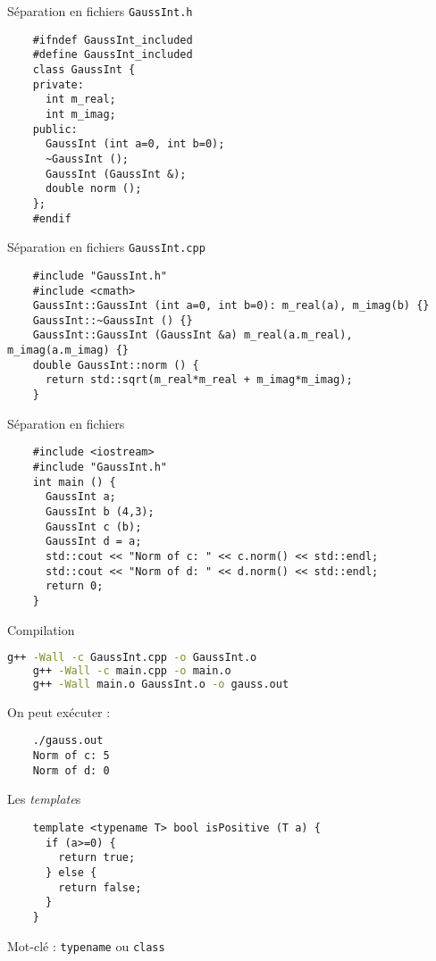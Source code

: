 \begin{frame}[fragile]{Séparation en fichiers}
  \texttt{GaussInt.h}
  \begin{lstlisting}
    #ifndef GaussInt_included
    #define GaussInt_included
    class GaussInt {
    private:
      int m_real;
      int m_imag;
    public:
      GaussInt (int a=0, int b=0);
      ~GaussInt ();
      GaussInt (GaussInt &);
      double norm ();
    };
    #endif
  \end{lstlisting}
\end{frame}

\begin{frame}[fragile]{Séparation en fichiers}
  \texttt{GaussInt.cpp}
  \begin{lstlisting}
    #include "GaussInt.h"
    #include <cmath>
    GaussInt::GaussInt (int a=0, int b=0): m_real(a), m_imag(b) {}
    GaussInt::~GaussInt () {}
    GaussInt::GaussInt (GaussInt &a) m_real(a.m_real), m_imag(a.m_imag) {}
    double GaussInt::norm () {
      return std::sqrt(m_real*m_real + m_imag*m_imag);
    }
  \end{lstlisting}
\end{frame}

\begin{frame}[fragile]{Séparation en fichiers}
  \begin{lstlisting}
    #include <iostream>
    #include "GaussInt.h"
    int main () {
      GaussInt a;
      GaussInt b (4,3);
      GaussInt c (b);
      GaussInt d = a;
      std::cout << "Norm of c: " << c.norm() << std::endl;
      std::cout << "Norm of d: " << d.norm() << std::endl;
      return 0;
    }
  \end{lstlisting}
\end{frame}

\begin{frame}[fragile]{Compilation}
  \begin{lstlisting}[language=bash]
    g++ -Wall -c GaussInt.cpp -o GaussInt.o
    g++ -Wall -c main.cpp -o main.o
    g++ -Wall main.o GaussInt.o -o gauss.out
  \end{lstlisting}

  On peut exécuter :
  \begin{lstlisting}
    ./gauss.out
    Norm of c: 5
    Norm of d: 0
  \end{lstlisting}
\end{frame}

\begin{frame}[fragile]{Les \textit{template}s}
  \begin{lstlisting}
    template <typename T> bool isPositive (T a) {
      if (a>=0) {
        return true;
      } else {
        return false;
      }
    }
  \end{lstlisting}

  Mot-clé : \texttt{typename} ou \texttt{class}
\end{frame}

